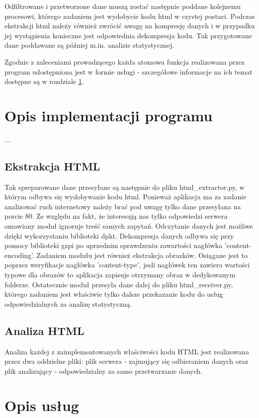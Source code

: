 \documentclass[12pt]{article}
\begin{document}
Odfiltrowane i przetworzone dane muszą zostać następnie poddane kolejnemu procesowi, którego zadaniem jest wydobycie kodu html w czystej postaci. Podczas ekstrakcji html należy również zwrócić uwagę na kompresję danych i w przypadku jej wystąpienia konieczne jest odpowiednia dekompresja kodu. 
Tak przygotowane dane poddawane są później m.in. analizie statystycznej. 

Zgodnie z zaleceniami prowadzącego każda atomowa funkcja realizowana przez program udostępniona jest w formie usługi - szczegółowe informacje na ich temat dostępne są w rozdziale \ref{dzialanie}. 

\section{Opis implementacji programu}
\label{dzialanie}
...
\subsection{Ekstrakcja HTML}
Tak spreparowane dane przesyłane są następnie do pliku html\_extractor.py, w którym odbywa się wydobywanie kodu html. 
Ponieważ aplikacja ma za zadanie analizować ruch internetowy należy brać pod uwagę tylko dane przesyłana na porcie 80. Ze względu na fakt, że interesują nas tylko odpowiedzi serwera omawiany moduł ignoruje treść samych zapytań. Odczytanie danych jest możliwe dzięki wykorzystaniu biblioteki dpkt. Dekompresja danych odbywa się przy pomocy biblioteki gzpi po uprzednim sprawdzeniu zawartości nagłówka 'content-encoding'. Zadaniem modułu jest również ekstrakcja obrazków. Osiągane jest to poprzez weryfikacje nagłówka 'content-type', jesli nagłówek ten zawiera wartości typowe dla obrazów to aplikacja zapisuje otrzymany obraz w dedykowanym folderze. Ostatecznie moduł przesyła dane dalej do pliku html\_receiver.py, którego zadaniem jest właściwie tylko dalsze przekazanie kodu do usług odpowiedzialnych za analizę statystyczną.

\subsection{Analiza HTML}
Analiza każdej z zaimplementowanych właściwości kodu HTML jest realizowana przez dwa oddzielne pliki: plik serwera - zajmujący się odbieraniem danych oraz plik analizujący - odpowiedzialny za samo przetwarzanie danych. 

\section{Opis usług}
\end{document}
